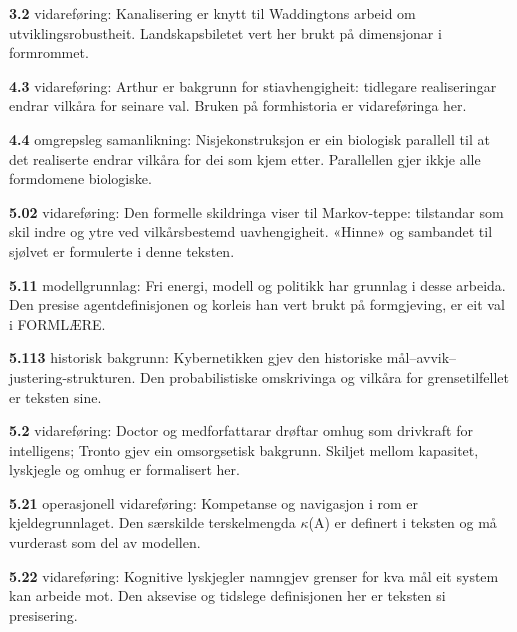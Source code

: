 \begin{widebody}
\noindent\hypertarget{kjeldenotat-3.2}{}\textbf{3.2} vidareføring: Kanalisering er knytt til Waddingtons arbeid om utviklingsrobustheit. Landskapsbiletet vert her brukt på dimensjonar i formrommet.\par\medskip
\noindent\hypertarget{kjeldenotat-4.3}{}\textbf{4.3} vidareføring: Arthur er bakgrunn for stiavhengigheit: tidlegare realiseringar endrar vilkåra for seinare val. Bruken på formhistoria er vidareføringa her.\par\medskip
\noindent\hypertarget{kjeldenotat-4.4}{}\textbf{4.4} omgrepsleg samanlikning: Nisjekonstruksjon er ein biologisk parallell til at det realiserte endrar vilkåra for dei som kjem etter. Parallellen gjer ikkje alle formdomene biologiske.\par\medskip
\noindent\hypertarget{kjeldenotat-5.02}{}\textbf{5.02} vidareføring: Den formelle skildringa viser til Markov-teppe: tilstandar som skil indre og ytre ved vilkårsbestemd uavhengigheit. «Hinne» og sambandet til sjølvet er formulerte i denne teksten.\par\medskip
\noindent\hypertarget{kjeldenotat-5.11}{}\textbf{5.11} modellgrunnlag: Fri energi, modell og politikk har grunnlag i desse arbeida. Den presise agentdefinisjonen og korleis han vert brukt på formgjeving, er eit val i FORMLÆRE.\par\medskip
\noindent\hypertarget{kjeldenotat-5.113}{}\textbf{5.113} historisk bakgrunn: Kybernetikken gjev den historiske mål–avvik–justering-strukturen. Den probabilistiske omskrivinga og vilkåra for grensetilfellet er teksten sine.\par\medskip
\noindent\hypertarget{kjeldenotat-5.2}{}\textbf{5.2} vidareføring: Doctor og medforfattarar drøftar omhug som drivkraft for intelligens; Tronto gjev ein omsorgsetisk bakgrunn. Skiljet mellom kapasitet, lyskjegle og omhug er formalisert her.\par\medskip
\noindent\hypertarget{kjeldenotat-5.21}{}\textbf{5.21} operasjonell vidareføring: Kompetanse og navigasjon i rom er kjeldegrunnlaget. Den særskilde terskelmengda \ensuremath{κ}(A) er definert i teksten og må vurderast som del av modellen.\par\medskip
\noindent\hypertarget{kjeldenotat-5.22}{}\textbf{5.22} vidareføring: Kognitive lyskjegler namngjev grenser for kva mål eit system kan arbeide mot. Den aksevise og tidslege definisjonen her er teksten si presisering.\par\medskip

\end{widebody}

